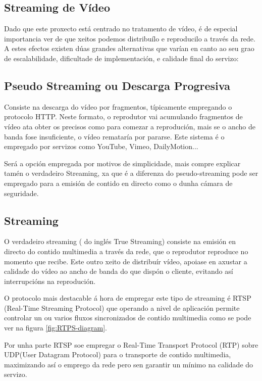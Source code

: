     \subsection{Streaming de Vídeo}
        Dado que este proxecto está centrado no tratamento de vídeo, é de especial importancia ver 
        de que xeitos podemos distribuílo e reproducilo a través da rede. A estes efectos existen dúas
        grandes alternativas que varían en canto ao seu grao de escalabilidade, dificultade de 
        implementación, e calidade final do servizo:
        
        \subsection{Pseudo Streaming ou Descarga Progresiva}
            Consiste na descarga do vídeo por fragmentos, típicamente empregando o protocolo HTTP. 
            Neste formato, o reprodutor vai acumulando fragmentos de vídeo ata obter os precisos como 
            para comezar a reprodución, mais se o ancho de banda fose insuficiente, o vídeo remataría
            por pararse. Este sistema é o empregado por servizos como YouTube, Vimeo, DailyMotion...
            
            Será a opción empregada por motivos de simplicidade, mais compre explicar tamén o verdadeiro 
            Streaming, xa que é a diferenza do pseudo-streaming pode ser empregado para a emisión de
            contido en directo como o dunha cámara de seguridade.
            
        \subsection{Streaming}
            O verdadeiro streaming ( do inglés True Streaming) consiste na emisión en directo do 
            contido multimedia a través da rede, que o reprodutor reproduce no momento que recibe.
            Este outro xeito de distribuír vídeo, apoiase en axustar a calidade do vídeo ao ancho de
            banda do que dispón o cliente, evitando así interrupcións na reprodución.
            
            O protocolo mais destacable á hora de empregar este tipo de streaming é RTSP (Real-Time
            Streaming Protocol) que operando a nivel de aplicación permite controlar un ou varios fluxos 
            sincronizados de contido multimedia como se pode ver na figura \ref{fig:RTPS-diagram}.
            
            Por unha parte RTSP soe empregar o Real-Time Transport Protocol (RTP) sobre UDP(User 
            Datagram Protocol) para o transporte de contido multimedia, maximizando así o emprego 
            da rede pero sen garantir un mínimo na calidade do servizo.
            
